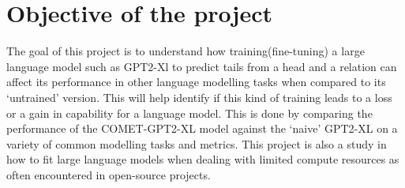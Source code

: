\documentclass[\main/thesis.tex]{subfiles}
\begin{document}
\chapter{Objective of the project}

The goal of this project is to understand how training(fine-tuning) a large language model such as GPT2-Xl 
to predict tails from a head and a relation \cite{hwang_comet-atomic_2020} can affect its performance 
in other language modelling tasks when compared to its `untrained' version. This will help identify if this kind 
of training leads to a loss or a gain in capability for a language model.
This is done by comparing the performance of the COMET-GPT2-XL\cite{west_symbolic_2021} model against the `naive' 
GPT2-XL on a variety of common modelling tasks and metrics. This project is also a study in how to fit large language
models when dealing with limited compute resources as often encountered in open-source projects. 
\end{document}
